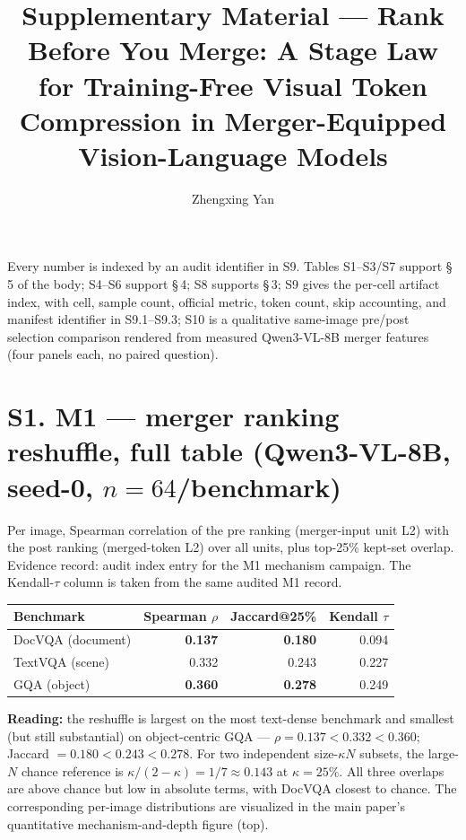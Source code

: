 \documentclass[journal]{IEEEtran}
\title{Supplementary Material --- Rank Before You Merge: A Stage Law for
  Training-Free Visual Token Compression in Merger-Equipped Vision-Language
  Models}
\author{Zhengxing Yan}
\begin{document}
\maketitle

\noindent\footnotesize Every number is indexed by an audit identifier in S9. Tables S1--S3/S7 support
\S\,5 of the body; S4--S6 support \S\,4; S8
supports \S\,3; S9 gives the per-cell artifact index, with cell, sample count,
official metric, token count, skip accounting, and manifest identifier in
S9.1--S9.3; S10 is a qualitative same-image pre/post selection comparison
rendered from measured Qwen3-VL-8B merger features (four panels each, no paired
question).

\section*{S1. M1 --- merger ranking reshuffle, full table (Qwen3-VL-8B, seed-0, $n = 64$/benchmark)}

Per image, Spearman correlation of the pre ranking (merger-input unit L2) with
the post ranking (merged-token L2) over all units, plus top-25\% kept-set
overlap. Evidence record: audit index entry for the M1
mechanism campaign. The Kendall-$\tau$ column is taken from the same audited
M1 record.

\begin{table}[ht]
  \centering
  \scriptsize
  \setlength{\tabcolsep}{3pt}
  \begin{tabular}{@{}l r r r@{}}
    \toprule
    Benchmark & Spearman $\rho$ & Jaccard@25\% & Kendall $\tau$ \\
    \midrule
    DocVQA (document) & \textbf{0.137} & \textbf{0.180} & 0.094 \\
    TextVQA (scene)   & 0.332          & 0.243          & 0.227 \\
    GQA (object)      & \textbf{0.360} & \textbf{0.278} & 0.249 \\
    \bottomrule
  \end{tabular}
\end{table}

\noindent\textbf{Reading:} the reshuffle is largest on the most text-dense
benchmark and smallest (but still substantial) on object-centric GQA ---
$\rho = 0.137 < 0.332 < 0.360$; Jaccard $= 0.180 < 0.243 < 0.278$. For two
independent size-$\kappa N$ subsets, the large-$N$ chance reference is
$\kappa/(2-\kappa)=1/7\approx0.143$ at $\kappa=25\%$. All three overlaps are
above chance but low in absolute terms, with DocVQA closest to chance. The
corresponding per-image distributions are visualized in the main paper's
quantitative mechanism-and-depth figure (top).
\end{document}
